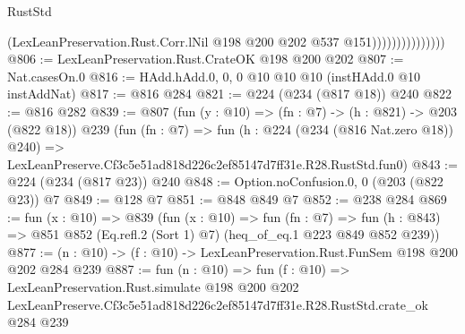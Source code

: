 \begin{lexlean}{RustStd}
\begin{coremodule}
                                (LexLeanPreservation.Rust.Corr.lNil
                                  @198
                                  @200
                                  @202
                                  @537
                                  @151)))))))))))))))
@806 := LexLeanPreservation.Rust.CrateOK @198 @200 @202
@807 := Nat.casesOn.{0}
@816 := HAdd.hAdd.{0, 0, 0} @10 @10 @10 (instHAdd.{0} @10 instAddNat)
@817 := @816 @284
@821 := @224 (@234 (@817 @18)) @240
@822 := @816 @282
@839 := @807
    (fun (y : @10) => (fn : @7) -> (h : @821) -> @203 (@822 @18))
    @239
    (fun (fn : @7) =>
    fun (h : @224 (@234 (@816 Nat.zero @18)) @240) =>
    LexLeanPreserve.Cf3c5e51ad818d226c2ef85147d7ff31e.R28.RustStd.fun0)
@843 := @224 (@234 (@817 @23)) @240
@848 := Option.noConfusion.{0, 0} (@203 (@822 @23)) @7
@849 := @128 @7
@851 := @848 @849 @7
@852 := @238 @284
@869 := fun (x : @10) =>
  @839
    (fun (x : @10) =>
    fun (fn : @7) =>
    fun (h : @843) => @851 @852 (Eq.refl.{2} (Sort 1) @7) (heq_of_eq.{1} @223 @849 @852 @239))
@877 := (n : @10) -> (f : @10) -> LexLeanPreservation.Rust.FunSem @198 @200 @202 @284 @239
@887 := fun (n : @10) =>
  fun (f : @10) =>
  LexLeanPreservation.Rust.simulate
    @198
    @200
    @202
    LexLeanPreserve.Cf3c5e51ad818d226c2ef85147d7ff31e.R28.RustStd.crate_ok
    @284
    @239
\end{coremodule}
\end{lexlean}
